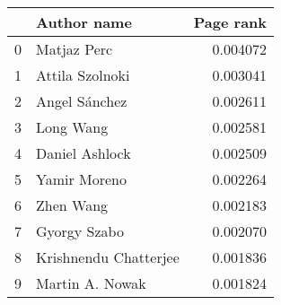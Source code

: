 \begin{tabular}{llr}
\toprule
{} &            Author name &  Page rank \\
\midrule
0 &            Matjaz Perc &   0.004072 \\
1 &        Attila Szolnoki &   0.003041 \\
2 &          Angel Sánchez &   0.002611 \\
3 &              Long Wang &   0.002581 \\
4 &         Daniel Ashlock &   0.002509 \\
5 &           Yamir Moreno &   0.002264 \\
6 &              Zhen Wang &   0.002183 \\
7 &           Gyorgy Szabo &   0.002070 \\
8 &  Krishnendu Chatterjee &   0.001836 \\
9 &        Martin A. Nowak &   0.001824 \\
\bottomrule
\end{tabular}
